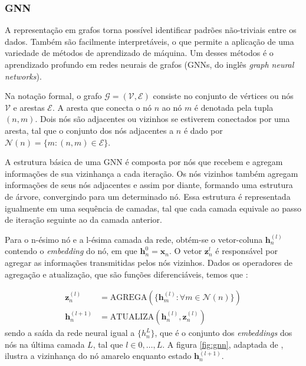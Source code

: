 \subsubsection{GNN}
A representação em grafos torna possível identificar padrões
não-triviais entre os dados. Também são facilmente interpretáveis, o que
permite a aplicação de uma variedade de métodos de aprendizado de máquina. Um
desses métodos é o aprendizado profundo em redes neurais de grafos (GNNs, do
inglês \textit{graph neural networks}).

Na notação formal, o grafo $\mathcal{G} = (\mathcal{V}, \mathcal{E})$ consiste no conjunto de
vértices ou nós $\mathcal{V}$ e arestas $\mathcal{E}$. A aresta que conecta
o nó $n$ ao nó $m$ é denotada pela tupla $(n, m)$. Dois nós são adjacentes ou vizinhos
se estiverem conectados por uma aresta, tal que o conjunto dos nós adjacentes a $n$
é dado por $\mathcal{N}(n) = \{m : (n, m) \in \mathcal{E}\}$. 

A estrutura básica de uma GNN é composta por nós que recebem e agregam
informações de sua vizinhança a cada iteração. Os nós vizinhos também agregam
informações de seus nós adjacentes e assim por diante, formando uma estrutura de
árvore, convergindo para um determinado nó. Essa estrutura é representada
igualmente em uma sequência de camadas, tal que cada camada equivale ao passo de
iteração seguinte ao da camada anterior.

Para o n-ésimo nó e a l-ésima camada da rede, obtém-se o vetor-coluna
$\mathbf{h}^{(l)}_n$ contendo o \textit{embedding} do nó, em que
$\mathbf{h}^{0}_n = \mathbf{x}_n$. O vetor $\mathbf{z}^{l}_n$ é responsável
por agregar as informações transmitidas pelos nós vizinhos. Dados os operadores
de agregação e atualização, que são funções diferenciáveis, temos que \cite{Bishop:DeepLearning24}:

\begin{align}
    \mathbf{z}^{(l)}_n &= \text{AGREGA}( \{ \mathbf{h}^{(l)}_m : \forall m \in \mathcal{N}(n)\} ) \label{eq:agrega} \\
    \mathbf{h}^{(l+1)}_n &= \text{ATUALIZA}(\mathbf{h}^{(l)}_n, \mathbf{z}^{(l)}_n) \label{eq:atualiza}
\end{align}
sendo a saída da rede neural igual a $\{h^{L}_n\}$, que é o conjunto dos
\textit{embeddings} dos nós na última camada $L$, tal que $l \in {0, \ldots,
L}$. A figura \ref{fig:gnn}, adaptada de \citet{graph_rep_learning}, ilustra
a vizinhança do nó amarelo enquanto estado $\mathbf{h}^{(l+1)}_n$.

